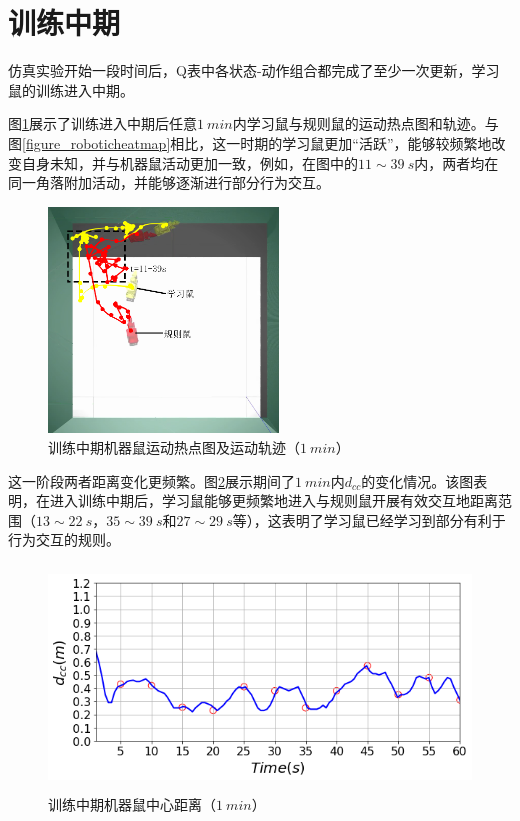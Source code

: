 \section{训练中期}
仿真实验开始一段时间后，Q表中各状态-动作组合都完成了至少一次更新，学习鼠的训练进入中期。

图\ref{figure_midheatmap}展示了训练进入中期后任意$1~min$内学习鼠与规则鼠的运动热点图和轨迹。与图\ref{figure_roboticheatmap}相比，这一时期的学习鼠更加“活跃”，能够较频繁地改变自身未知，并与机器鼠活动更加一致，例如，在图中的$11\sim39~s$内，两者均在同一角落附加活动，并能够逐渐进行部分行为交互。
\begin{figure}[htbp]
  \vspace{13pt}
  \centering
  \includegraphics[height=6cm]{images/ch05/midterm/heatmap.png}
  \caption{训练中期机器鼠运动热点图及运动轨迹（$1~min$）}\label{figure_midheatmap}
\end{figure}

这一阶段两者距离变化更频繁。图\ref{figure_middistance}展示期间了$1~min$内$d_{cc}$的变化情况。该图表明，在进入训练中期后，学习鼠能够更频繁地进入与规则鼠开展有效交互地距离范围（$13\sim22~s$，$35\sim39~s$和$27\sim29~s$等），这表明了学习鼠已经学习到部分有利于行为交互的规则。
\begin{figure}[htbp]
  \vspace{13pt}
  \centering
  \includegraphics[height=6cm]{images/ch05/midterm/distance.png}
  \caption{训练中期机器鼠中心距离（$1~min$）}\label{figure_middistance}
\end{figure}

